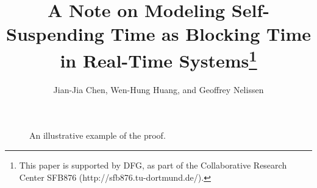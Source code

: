 



\paperfalse

\usepackage{tikz}
\usetikzlibrary{arrows}
\usepackage{sansmath}
\tikzset{>=latex}
\usepackage{enumerate}




\title{A Note on Modeling Self-Suspending Time as Blocking Time in Real-Time Systems\thanks{This paper is supported by DFG, as part of the Collaborative Research Center SFB876 (http://sfb876.tu-dortmund.de/).}}

\author{Jian-Jia Chen, Wen-Hung Huang, and Geoffrey Nelissen}


\maketitle



\begin{figure}[t]
  \centering
  
\caption{An illustrative example of the proof.}
\label{fig:example}  
\end{figure}

{}


